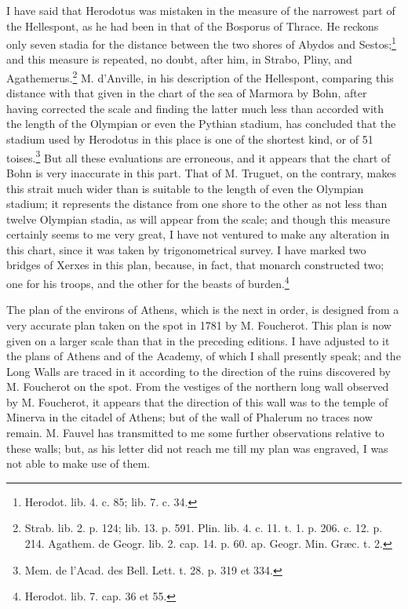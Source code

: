 \documentclass[a4paper, 11pt, oneside, polutonikogreek, english]{article}
\begin{document}
I have said that Herodotus was mistaken in the measure of the narrowest part of the Hellespont, as he had been in that of the Bosporus of Thrace. He reckons only seven stadia for the distance between the two shores of Abydos and Sestos;\footnote{Herodot. lib. 4. c. 85; lib. 7. c. 34.} and this measure is repeated, no doubt, after him, in Strabo, Pliny, and Agathemerus.\footnote{Strab. lib. 2. p. 124; lib. 13. p. 591. Plin. lib. 4. c. 11. t. 1. p. 206. c. 12. p. 214. Agathem. de Geogr. lib. 2. cap. 14. p. 60. ap. Geogr. Min. Græc. t. 2.} M. d'Anville, in his description of the Hellespont, comparing this distance with that given in the chart of the sea of Marmora by Bohn, after having corrected the scale and finding the latter much less than accorded with the length of the Olympian or even the Pythian stadium, has concluded that the stadium used by Herodotus in this place is one of the shortest kind, or of 51 toises.\footnote{Mem. de l'Acad. des Bell. Lett. t. 28. p. 319 et 334.} But all these evaluations are erroneous, and it appears that the chart of Bohn is very inaccurate in this part. That of M. Truguet, on the contrary, makes this strait much wider than is suitable to the length of even the Olympian stadium; it represents the distance from one shore to the other as not less than twelve Olympian stadia, as will appear from the scale; and though this measure certainly seems to me very great, I have not ventured to make any alteration in this chart, since it was taken by trigonometrical survey. I have marked two bridges of Xerxes in this plan, because, in fact, that monarch constructed two; one for his troops, and the other for the beasts of burden.\footnote{Herodot. lib. 7. cap. 36 et 55.}

The plan of the environs of Athens, which is the next in order, is designed from a very accurate plan taken on the spot in 1781 by M. Foucherot. This plan is now given on a larger scale than that in the preceding editions. I have adjusted to it the plans of Athens and of the Academy, of which I shall presently speak; and the Long Walls are traced in it according to the direction of the ruins discovered by M. Foucherot on the spot. From the vestiges of the northern long wall observed by M. Foucherot, it appears that the direction of this wall was to the temple of Minerva in the citadel of Athens; but of the wall of Phalerum no traces now remain. M. Fauvel has transmitted to me some further observations relative to these walls; but, as his letter did not reach me till my plan was engraved, I was not able to make use of them.
\end{document}
